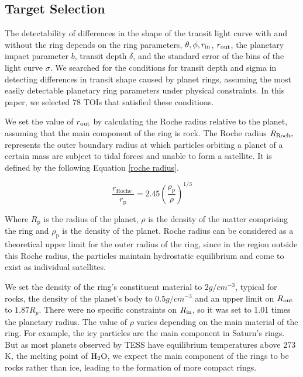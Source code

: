 \documentclass[fleqn,usenatbib, onecolumn,dvipdfmx]{mnras}
\begin{document}
\subsection{Target Selection}\label{Target Selection}
The detectability of differences in the shape of the transit light curve with and without the ring depends on the ring parameters, $\theta, \phi, r_{\rm{in}}$, $r_{\rm{out}}$, the planetary impact parameter $b$, transit depth $\delta$, and the standard error of the bins of the light curve $\sigma$. 
We searched for the conditions for transit depth and sigma in detecting differences in transit shape caused by planet rings, assuming the most easily detectable planetary ring parameters under physical constraints. In this paper, we selected 78 TOIs that satisfied these conditions.

We set the value of $r_{\rm{out}}$ by calculating the Roche radius relative to the planet, assuming that the main component of the ring is rock. The Roche radius $R_{\rm{Roche}}$ represents the outer boundary radius at which particles orbiting a planet of a certain mass are subject to tidal forces and unable to form a satellite. It is defined by the following Equation \ref{roche radius}.

\begin{equation}\label{roche radius}
    \frac{r_{\text {Roche }}}{r_{\mathrm{p}}}=2.45\left(\frac{\rho_{\mathrm{p}}}{\rho}\right)^{1 / 3}
\end{equation}

Where $R_{\mathrm{p}}$ is the radius of the planet, $\rho$ is the density of the matter comprising the ring and $\rho_{\mathrm{p}}$ is the density of the planet. Roche radius can be considered as a theoretical upper limit for the outer radius of the ring, since in the region outside this Roche radius, the particles maintain hydrostatic equilibrium and come to exist as individual satellites.

We set the density of the ring's constituent material to $2 g/cm^{-3}$, typical for rocks, the density of the planet's body to $0.5 g/cm^{-3}$ and an upper limit on $R_{\rm{out}}$ to $1.87 R_p$. There were no specific constraints on $R_{\rm{in}}$, so it was set to 1.01 times the planetary radius.
The value of $\rho$ varies depending on the main material of the ring. For example, the icy particles are the main component in Saturn's rings. But as most planets observed by TESS have equilibrium temperatures above 273 K, the melting point of $\rm{H_{2}O}$, we expect the main component of the rings to be rocks rather than ice, leading to the formation of more compact rings.
\end{document}
